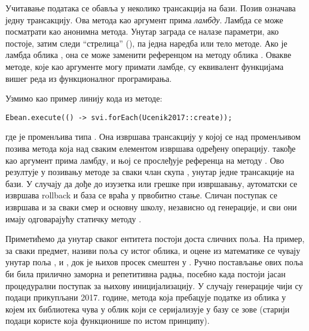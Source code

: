 Учитавање података се обавља у неколико трансакција на бази. Позив  означава једну трансакцију. Oва метода као аргумент прима \emph{ламбду}. Ламбда се може посматрати као анонимна метода. Унутар заграда се налазе параметри, ако постоје, затим следи \enquote{стрелица} (\code{->}), па једна наредба или тело методе. Ако је ламбда облика , она се може заменити референцом на методу облика . Овакве методе, које као аргументе могу примати ламбде, су еквивалент функцијама вишег реда из функционалног програмирања.

Узмимо као пример линију кода из  методе: 
\begin{verbatim}
Ebean.execute(() -> svi.forEach(Ucenik2017::create));
\end{verbatim}
где је  променљива типа . Она извршава трансакцију у којој се над променљивом  позива метода  која над сваким елементом извршава одређену операцију.  такође као аргумент прима ламбду, и њој се прослеђује референца на методу . Ово резултује у позивању методе  за сваки члан скупа , унутар једне трансакције на бази. У случају да дође до изузетка или грешке при извршавању, аутоматски се извршава rollback и база се враћа у првобитно стање. Сличан поступак се извршава и за сваки смер и основну школу, независно од генерације, и сви они имају одговарајућу статичку методу .

Приметићемо да унутар сваког ентитета постоји доста сличних поља. На пример, за сваки предмет, називи поља су истог облика, и оцене из математике се чувају унутар поља ,  и , док је њихов просек смештен у . Ручно постављање ових поља би била прилично заморна и репетитивна радња, посебно када постоји јасан процедурални поступак за њихову иницијализацију. У случају генерације чији су подаци прикупљани 2017. године, метода која пребацује податке из облика у којем их библиотека чува у облик који се серијализује у базу се зове  (старији подаци користе  која функционише по истом принципу).

